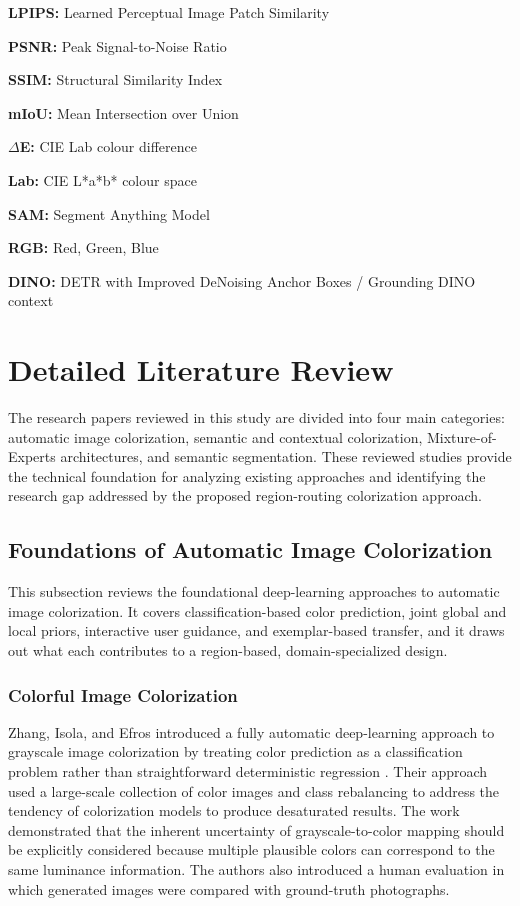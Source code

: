 \documentclass{FastFyp}
\begin{document}
\textbf{LPIPS:} Learned Perceptual Image Patch Similarity

\textbf{PSNR:} Peak Signal-to-Noise Ratio

\textbf{SSIM:} Structural Similarity Index

\textbf{mIoU:} Mean Intersection over Union

\textbf{$\Delta$E:} CIE Lab colour difference

\textbf{Lab:} CIE L*a*b* colour space

\textbf{SAM:} Segment Anything Model

\textbf{RGB:} Red, Green, Blue

\textbf{DINO:} DETR with Improved DeNoising Anchor Boxes / Grounding DINO context

\section{Detailed Literature Review}

The research papers reviewed in this study are divided into four main categories: automatic image colorization, semantic and contextual colorization, Mixture-of-Experts architectures, and semantic segmentation. These reviewed studies provide the technical foundation for analyzing existing approaches and identifying the research gap addressed by the proposed region-routing colorization approach.~

\subsection{Foundations of Automatic Image Colorization}

This subsection reviews the foundational deep-learning approaches to automatic image colorization. It covers classification-based color prediction, joint global and local priors, interactive user guidance, and exemplar-based transfer, and it draws out what each contributes to a region-based, domain-specialized design.

\subsubsection{Colorful Image Colorization}

Zhang, Isola, and Efros introduced a fully automatic deep-learning approach to grayscale image colorization by treating color prediction as a classification problem rather than straightforward deterministic regression \cite{ref1}. Their approach used a large-scale collection of color images and class rebalancing to address the tendency of colorization models to produce desaturated results. The work demonstrated that the inherent uncertainty of grayscale-to-color mapping should be explicitly considered because multiple plausible colors can correspond to the same luminance information. The authors also introduced a human evaluation in which generated images were compared with ground-truth photographs.
\end{document}
